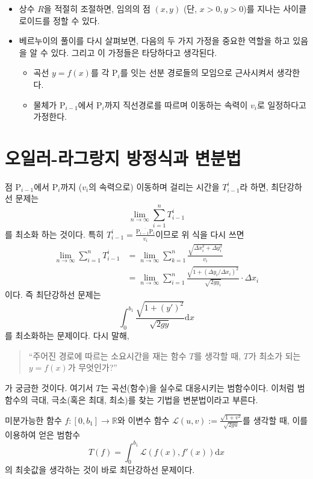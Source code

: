 \begin{itemize}
\item 상수 $R$을 적절히 조절하면, 임의의 점 $(x, y)$ (단, $x>0, y>0$)를 지나는 사이클로이드를 정할 수 있다.

\item 베르누이의 풀이를 다시 살펴보면, 다음의 두 가지 가정을 중요한 역할을 하고 있음을 알 수 있다. 그리고 이 가정들은 타당하다고 생각된다.
\begin{itemize}
\item  곡선 $ y=f(x)$를 각 $\mathrm{P}_i$를 잇는 선분 경로들의 모임으로 근사시켜서 생각한다. %
\item  물체가 $\mathrm{P}_{i-1}$에서 $\mathrm{P}_i$까지 직선경로를 따르며 이동하는 속력이 $v_i$로 일정하다고 가정한다. 
\end{itemize}
\end{itemize}

\section{오일러-라그랑지 방정식과 변분법}

점 $\mathrm{P}_{i-1}$에서 $\mathrm{P}_i$까지 ($v_i$의 속력으로) 이동하며 걸리는 시간을 $T_{i-1}^i$라 하면, 최단강하선 문제는
\[
\lim_{n\to\infty}\sum_{i=1}^{n}T_{i-1}^i
\]
를 최소화 하는 것이다. 특히 $T_{i-1}^i=\frac{\overline{\mathrm{P}_{i-1}\mathrm{P}_i}}{v_i}$이므로 위 식을 다시 쓰면
\begin{align*}
\lim_{n\to\infty}\sum_{i=1}^{n}T_{i-1}^i&=\lim_{n\to\infty}\sum_{k=1}^n \frac{\sqrt{\Delta x_i^2+\Delta y_i^2}}{v_i} \\
& = \lim_{n\to\infty}\sum_{i=1}^n \frac{\sqrt{1+(\Delta y_i/\Delta x_i)^2}}{\sqrt{2gy_i}}\cdot \Delta x_i
\end{align*}
이다. 즉 최단강하선 문제는
\[
\int_0^{b_1}\frac{\sqrt{1+(y')^2}}{\sqrt{2gy}} \mathrm{d}x
\]
를 최소화하는 문제이다.  다시 말해, 
\begin{quote}
``주어진 경로에 따르는 소요시간을 재는 함수 $T$를 생각할 때, $T$가 최소가 되는 $y=f(x)$가 무엇인가?''
\end{quote}
가 궁금한 것이다. 여기서 $T$는 곡선(함수)을 실수로 대응시키는 범함수이다. 이처럼 범함수의 극대, 극소(혹은 최대, 최소)를 찾는 기법을 변분법이라고 부른다. \par 

미분가능한 함수  $f:[0, b_1]\to\mathbb{R}$와 이변수 함수 $\mathscr{L}(u, v):=\frac{\sqrt{1+v^2}}{\sqrt{2gu}}$를 생각할 때, 이를 이용하여 얻은 범함수
\[
T(f)=\int_0^{b_1}\mathscr{L}(f(x), f'(x)) \mathrm{d}x%
\]
의 최솟값을 생각하는 것이 바로 최단강하선 문제이다.\par 

